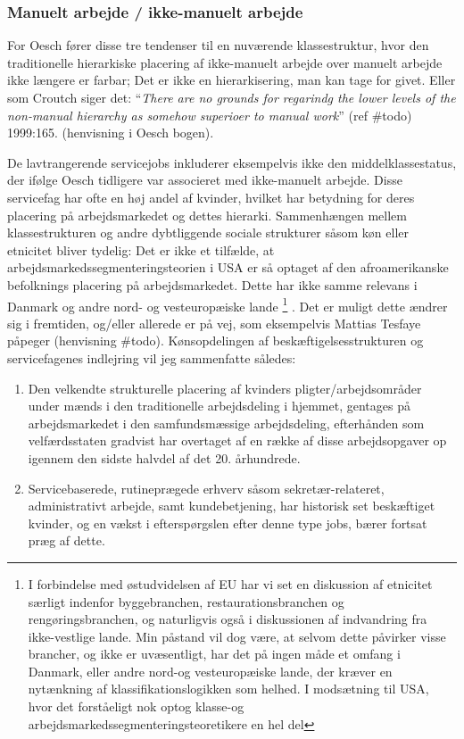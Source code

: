 %
\subsubsection{Manuelt arbejde / ikke-manuelt arbejde}
%

For Oesch fører disse tre tendenser til en nuværende klassestruktur, hvor den traditionelle hierarkiske placering af ikke-manuelt arbejde over manuelt arbejde ikke længere er farbar; Det er ikke en hierarkisering, man kan tage for givet. Eller som Croutch siger det: “\emph{There are no grounds for regarindg the lower levels of the non-manual hierarchy as somehow superioer to manual work}” (ref \#todo) 1999:165. (henvisning i Oesch bogen).

De lavtrangerende servicejobs inkluderer eksempelvis ikke den middelklassestatus, der ifølge Oesch tidligere var associeret med ikke-manuelt arbejde. Disse servicefag har ofte en høj andel af kvinder, hvilket har betydning for deres placering på arbejdsmarkedet og dettes hierarki.   Sammenhængen mellem klassestrukturen og andre dybtliggende sociale strukturer såsom køn eller etnicitet bliver tydelig: Det er ikke et tilfælde, at arbejdsmarkedssegmenteringsteorien i USA er så optaget af den afroamerikanske befolknings placering på arbejdsmarkedet. Dette har ikke samme relevans i Danmark og andre nord- og vesteuropæiske lande%
%
\footnote{  I forbindelse med østudvidelsen af EU har vi set en diskussion af etnicitet særligt indenfor byggebranchen, restaurationsbranchen og rengøringsbranchen, og naturligvis også i diskussionen af indvandring fra ikke-vestlige lande. Min påstand vil dog være, at selvom dette påvirker visse brancher, og ikke er uvæsentligt, har det på ingen måde et omfang i Danmark, eller andre nord-og vesteuropæiske lande, der kræver en nytænkning af klassifikationslogikken som helhed. I modsætning til USA, hvor det forståeligt nok optog klasse-og arbejdsmarkedssegmenteringsteoretikere en hel del}%
%
. Det er muligt dette ændrer sig i fremtiden, og/eller allerede er på vej, som eksempelvis Mattias Tesfaye påpeger (henvisning \#todo). Kønsopdelingen af beskæftigelsesstrukturen og servicefagenes indlejring vil jeg sammenfatte således:

%
\begin{enumerate}
 \itemsep -0.5em
 	\item Den velkendte strukturelle placering af kvinders pligter/arbejdsområder under mænds i den traditionelle arbejdsdeling i hjemmet, gentages på arbejdsmarkedet i den samfundsmæssige arbejdsdeling, efterhånden som velfærdsstaten gradvist har overtaget af en række af disse arbejdsopgaver op igennem den sidste halvdel af det 20. århundrede.
 	\item Servicebaserede, rutineprægede erhverv såsom sekretær-relateret, administrativt arbejde, samt kundebetjening, har historisk set beskæftiget kvinder, og en vækst i efterspørgslen efter denne type jobs, bærer fortsat præg af dette. 
\end{enumerate}
%

